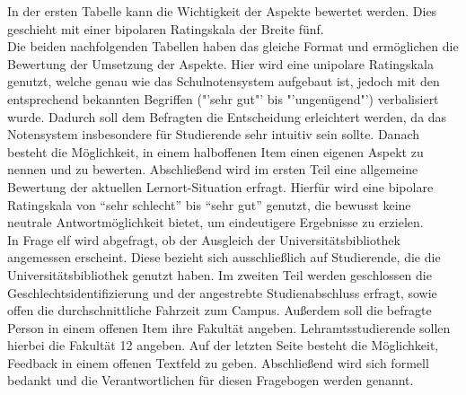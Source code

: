 \documentclass[11pt, a4paper]{article}
\begin{document}
In der ersten Tabelle kann die Wichtigkeit der Aspekte bewertet werden. Dies geschieht mit einer bipolaren Ratingskala der Breite fünf.\\
Die beiden nachfolgenden Tabellen haben das gleiche Format und ermöglichen die Bewertung der Umsetzung der Aspekte. Hier wird eine unipolare Ratingskala genutzt, welche genau wie das Schulnotensystem aufgebaut ist, jedoch
mit den entsprechend bekannten Begriffen ("'sehr gut"' bis "'ungenügend"') verbalisiert wurde.
Dadurch soll dem Befragten die Entscheidung erleichtert werden, da das Notensystem insbesondere für Studierende sehr intuitiv sein sollte.
Danach besteht die Möglichkeit, in einem halboffenen Item einen eigenen Aspekt zu nennen und zu bewerten.
Abschließend wird im ersten Teil eine allgemeine Bewertung der aktuellen Lernort-Situation erfragt.
Hierfür wird eine bipolare Ratingskala von “sehr schlecht” bis “sehr gut” genutzt, die bewusst keine neutrale Antwortmöglichkeit bietet, um eindeutigere Ergebnisse zu erzielen.\\
In Frage elf wird abgefragt, ob der Ausgleich der Universitätsbibliothek angemessen erscheint. Diese bezieht sich ausschließlich auf Studierende, die die Universitätsbibliothek genutzt haben.
Im zweiten Teil werden geschlossen die Geschlechtsidentifizierung und der angestrebte Studienabschluss erfragt, sowie offen die durchschnittliche Fahrzeit zum Campus.
Außerdem soll die befragte Person in einem offenen Item ihre Fakultät angeben.
Lehramtsstudierende sollen hierbei die Fakultät 12 angeben.
Auf der letzten Seite besteht die Möglichkeit, Feedback in einem offenen Textfeld zu geben.
Abschließend wird sich formell bedankt und die Verantwortlichen für diesen Fragebogen werden genannt.\\
\end{document}
